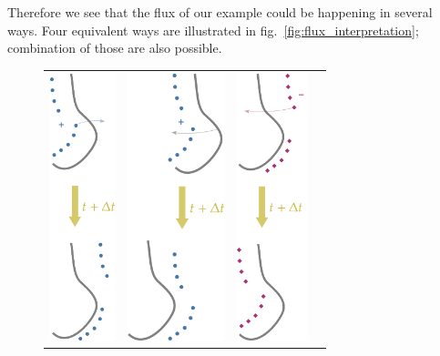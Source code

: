 \documentclass[a4paper,12pt,%
onecolumn,oneside,titlepage,%
british%
]{memoir}
\renewcommand*{\|}[1][]{\nonscript\:#1\vert\nonscript\:\mathopen{}}
\newcommand*{\fig}{fig.}%
\begin{document}
Therefore we see that the flux of our example could be happening in several ways. Four equivalent ways are illustrated in \fig~\ref{fig:flux_interpretation}; combination of those are also possible.
\begin{figure}[h]\centering
\begin{tabularx}{\linewidth}{|X|X|X|X|}
\centering  \includegraphics[align=t,height=21em]{flux_pq.pdf}
&
\centering   \includegraphics[align=t,height=21em]{flux_ps.pdf}
&
\centering   \includegraphics[align=t,height=21em]{flux_mq.pdf}

\end{tabularx}
\end{figure}
\end{document}
